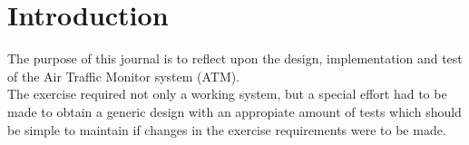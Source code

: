 \section{Introduction}
The purpose of this journal is to reflect upon the design, implementation and test of the Air Traffic Monitor system (ATM).\\
The exercise required not only a working system, but a special effort had to be made to obtain a generic design with an appropiate amount of tests which should be simple to maintain if changes in the exercise requirements were to be made. \\

